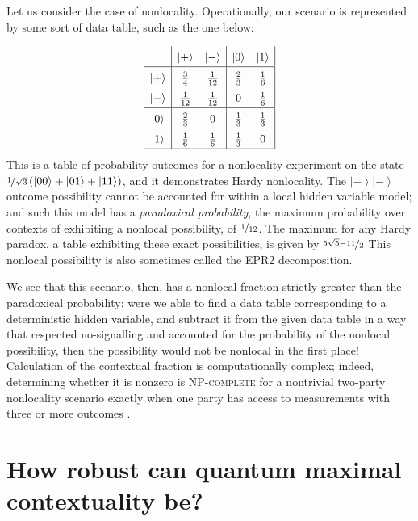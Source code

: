 \documentclass{amsart}
\theoremstyle{definition}
\newcommand{\ket}[1]{{\left\vert{#1}\right\rangle}}
\begin{document}
Let us consider the case of nonlocality. Operationally, our scenario is represented by some sort of data table, such as the one below:

\begin{equation}\renewcommand{\arraystretch}{1.5}
\begin{array}{c| c c | c c |} \renewcommand{\arraystretch}{1.5}
&\ket{+}&\ket{-}&\ket{0}&\ket{1}\\\hline
\ket{+}&\frac{3}{4} &\frac{1}{12}  &\frac{2}{3} & \frac{1}{6}\\
\ket{-}&\frac{1}{12} &\frac{1}{12}  &0 &\frac{1}{6}\\ \hline
\ket{0}&\frac{2}{3}&0&\frac{1}{3} &\frac{1}{3} \\
\ket{1}&\frac{1}{6}&\frac{1}{6} &\frac{1}{3} &0 \\ \hline
\end{array} \renewcommand{\arraystretch}{1}
\end{equation}
This is a table of probability outcomes for a nonlocality experiment on the state $\nicefrac{1}{\sqrt{3}}\left(\ket{00}+\ket{01}+\ket{11}\right)$, and it demonstrates Hardy nonlocality. The $\ket{-}\ket{-}$ outcome possibility cannot be accounted for within a local hidden variable model; and such this model has a \emph{paradoxical probability}, the maximum probability over contexts of exhibiting a nonlocal possibility, of $\nicefrac{1}{12}$. The maximum for any Hardy paradox, a table exhibiting these exact possibilities, is given by $\nicefrac{5\sqrt{5}-11}{2}$ This nonlocal possibility is also sometimes called the EPR2 decomposition.

We see that this scenario, then, has a nonlocal fraction strictly greater than the paradoxical probability; were we able to find a data table corresponding to a deterministic hidden variable, and subtract it from the given data table in a way that respected no-signalling and accounted for the probability of the nonlocal possibility, then the possibility would not be nonlocal in the first place!
Calculation of the contextual fraction is computationally complex; indeed, determining whether it is nonzero is \textsc{NP-complete} for a 
nontrivial two-party nonlocality scenario exactly when one party has access to measurements with three or more outcomes \cite{SimmCC}.



\section{How robust can quantum maximal contextuality be?}
\end{document}
